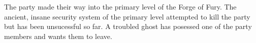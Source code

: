 The party made their way into the primary level of the Forge of Fury.
The ancient, insane security system of the primary level attempted to kill the party but has been unsucessful so far.
A troubled ghost has posessed one of the party members and wants them to leave.
